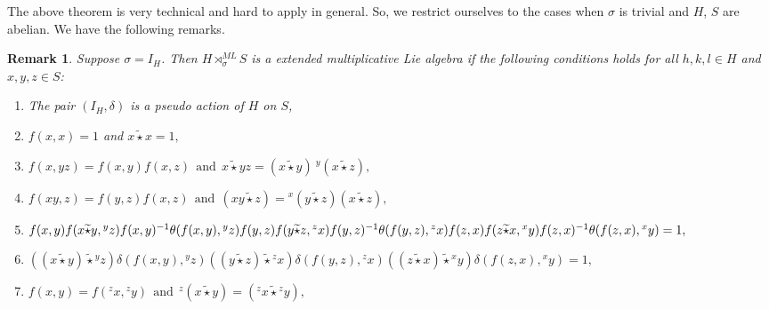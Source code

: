 \documentclass[10 pt,oneside,reqno,a4paper]{amsart}
\newtheorem{remark}[theorem]{Remark}
\numberwithin{equation}{section}
\begin{document}
The above theorem is very technical and hard to apply in general. So, we restrict ourselves to the cases when $\sigma$ is trivial and $H$, $S$ are abelian. We have the following remarks.

\begin{remark}\label{4.2} Suppose $\sigma=I_H$.  Then  $H \rtimes_{\sigma}^{ML}S$ is a extended multiplicative Lie algebra 
    if  the following conditions holds  for all $h,k,l\in H$ and $x,y,z\in S$:
        \begin{enumerate}
        \item The pair $(I_H, \delta)$ is a pseudo action of $H$ on $S$,
            \item $f(x,x)=1$ and $x \widetilde{\star} x=1,$
            \item $ f(x,yz)= f(x,y) f(x,z) ~~\text{and}~~ x\widetilde{\star} yz= (x\widetilde{\star} y)~{^y(x\widetilde{\star} z)},$
            \item $f(xy,z)=f(y,z) f(x,z) ~~\text{and}~~ (xy\widetilde{\star} z)={^x(y\widetilde{\star} z)}(x\widetilde{\star} z),$
             \item $f(x,y) f(x\widetilde{\star} y,{^yz})  f(x,y)^{-1}\theta(f(x,y), {^yz}) f(y,z) \\ f(y\widetilde{\star} z,{^zx})  f(y,z)^{-1}\theta(f(y,z), {^zx})   f(z,x) \\ f(z\widetilde{\star} x,{^xy})  f(z,x)^{-1}\theta(f(z,x), {^xy}) =1,$ 

            \item $((x\widetilde{\star} y) \widetilde {\star} {^yz})\delta(f(x,y), {^yz})  ((y\widetilde{\star} z) \widetilde {\star} {^zx})\delta(f(y,z), {^zx})((z\widetilde{\star} x) \widetilde {\star} {^xy})\delta(f(z,x), {^xy})=1,$

\item $f(x,y)=f({^zx}, {^zy}) ~~\text{and}~~ {^z(x\widetilde{\star} y)}=({^zx} \widetilde{\star} {^zy}),$


\end{enumerate}
\end{remark}
\end{document}
